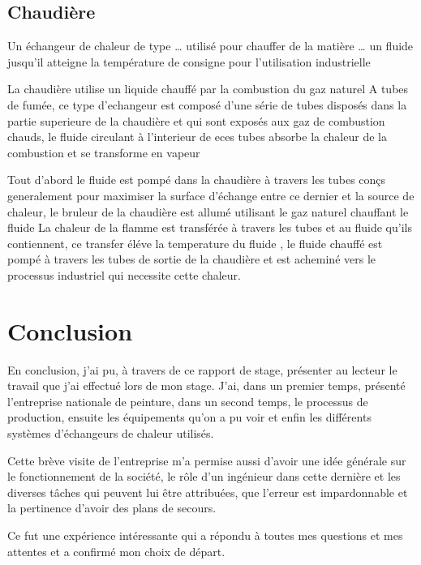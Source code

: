\documentclass[20pt,a4paper]{report}
\begin{document}
\begin{large}
		\section{Chaudière}
Un échangeur de chaleur de type … utilisé pour chauffer de la matière … un fluide jusqu’il atteigne la température de consigne pour l’utilisation industrielle

La chaudière utilise un liquide chauffé par la combustion du gaz naturel 
A tubes de fumée, ce type d’echangeur est composé d’une série de tubes disposés dans la partie superieure de la chaudière et qui sont exposés aux gaz de combustion chauds, le fluide circulant à l’interieur de eces tubes absorbe la chaleur de la combustion et se transforme en vapeur 

Tout d’abord le fluide est pompé dans la chaudière à travers les tubes conçs generalement pour maximiser la surface d’échange entre ce dernier et la source de chaleur, le bruleur de la chaudière est allumé utilisant le gaz naturel chauffant le fluide
La chaleur de la flamme est transférée à travers les tubes et au fluide qu’ils contiennent, ce transfer éléve la temperature du fluide , le fluide chauffé est pompé à travers les tubes de sortie de la chaudière et est acheminé vers le processus industriel qui necessite cette chaleur.
		\end{large}

\newpage

		\chapter{Conclusion }
		
		\newpage

        \begin{Large}
        En conclusion, j’ai pu, à travers de ce rapport de stage, présenter au lecteur le travail que j’ai effectué lors de mon stage. J’ai, dans un premier temps, présenté l’entreprise nationale de peinture, dans un second temps, le processus de production, ensuite les équipements qu’on a pu voir et enfin les différents systèmes d’échangeurs de chaleur utilisés.
        
      Cette brève visite de l’entreprise m’a permise aussi d’avoir une idée générale sur le fonctionnement de la société, le rôle d’un ingénieur dans cette dernière et les diverses tâches qui peuvent lui être attribuées, que l’erreur est impardonnable et la pertinence d’avoir des plans de secours.
      
      Ce fut une expérience intéressante qui a répondu à toutes mes questions et mes attentes et a confirmé mon choix de départ.
        \end{Large}

		
\end{document}
